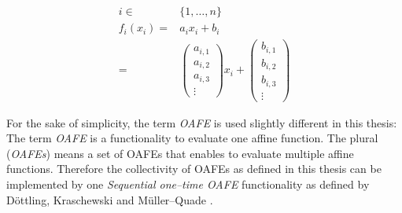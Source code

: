 \begin{align*}
  i \in& \{1, \ldots, n\}\\
%
  f_i(x_i) = &
  a_ix_i + b_i \\
%
  = &
\begin{pmatrix}a_{i,1}\\a_{i,2}\\a_{i,3}\\\vdots\end{pmatrix}x_i +
\begin{pmatrix}b_{i,1}\\b_{i,2}\\b_{i,3}\\\vdots\end{pmatrix}
\end{align*}

\noindent{}For the sake of simplicity, the term \emph{OAFE} is used slightly
different in this thesis: The term \emph{OAFE} is a functionality to evaluate
one affine function. The plural (\emph{OAFEs}) means a set of OAFEs that enables
to evaluate multiple affine functions. Therefore the collectivity of OAFEs as
defined in this thesis can be implemented by one \emph{Sequential one--time
OAFE} functionality as defined by Döttling, Kraschewski and Müller--Quade
\cite{davidgoliath}.


%
%
\label{sec:drav}

